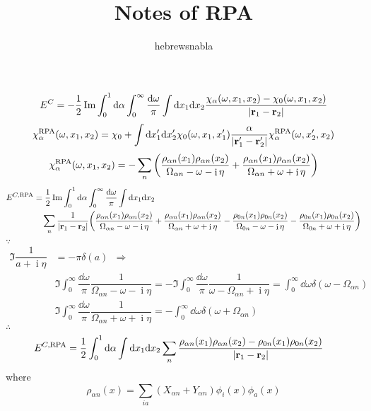 \documentclass[a4paper]{article}
\title{Notes of RPA}
\author{hebrewsnabla}
\DeclareMathOperator{\I}{\mathrm{i}}
\DeclareMathOperator{\dra}{\;\Rightarrow\;}
\DeclareMathOperator{\RPA}{\mathrm{RPA}}
\numberwithin{equation}{section}
\begin{document}
\maketitle


\begin{equation}\label{key}
E^C = -\dfrac{1}{2}\Im \int_0^1 \dd\alpha \int_0^\infty \dfrac{\dd\omega}{\pi} \int \dd x_1\dd x_2 \dfrac{\chi_\alpha(\omega,x_1,x_2) - \chi_0(\omega,x_1,x_2)}{\abs{\vb{r}_1 - \vb{r}_2}}
\end{equation}
\begin{equation}\label{key}
\chi_\alpha^{\RPA}(\omega,x_1,x_2) = \chi_0 + \int \dd x_1'\dd x_2' \chi_0(\omega,x_1,x_1') \dfrac{\alpha}{\abs{\vb{r}_1' - \vb{r}_2'}} \chi_\alpha^{\RPA}(\omega,x_2',x_2)
\end{equation}
\begin{equation}\label{key}
\chi_\alpha^{\RPA}(\omega,x_1,x_2) = -\sum_n \qty(\dfrac{\rho_{\alpha n}(x_1) \rho_{\alpha n}(x_2)}{\Omega_{\alpha n} - \omega - \I\eta} + \dfrac{\rho_{\alpha n}(x_1) \rho_{\alpha n}(x_2)}{\Omega_{\alpha n} + \omega + \I\eta})
\end{equation}
\begin{align}
E^{C,\RPA} &= \dfrac{1}{2}\Im \int_0^1 \dd\alpha \int_0^\infty \dfrac{\dd\omega}{\pi} \int \dd x_1\dd x_2 \notag\\ 
& \quad \sum_n \dfrac{1}{\abs{\vb{r}_1 - \vb{r}_2}}\qty(\dfrac{\rho_{\alpha n}(x_1) \rho_{\alpha n}(x_2)}{\Omega_{\alpha n} - \omega - \I\eta} + \dfrac{\rho_{\alpha n}(x_1) \rho_{\alpha n}(x_2)}{\Omega_{\alpha n} + \omega + \I\eta} 
- \dfrac{\rho_{0 n}(x_1) \rho_{0 n}(x_2)}{\Omega_{0 n} - \omega - \I\eta} - \dfrac{\rho_{0 n}(x_1) \rho_{0 n}(x_2)}{\Omega_{0 n} + \omega + \I\eta})
\end{align}
$ \because $
\begin{align}
\Im \dfrac{1}{a + \I\eta} &= -\pi\delta(a) \;\dra\; \\
& \Im\int_0^\infty  \dfrac{\dd\omega}{\pi} \dfrac{1}{\Omega_{\alpha n} - \omega - \I\eta} = -\Im\int_0^\infty  \dfrac{\dd\omega}{\pi} \dfrac{1}{\omega - \Omega_{\alpha n} + \I\eta} = \int_0^\infty \dd\omega \delta(\omega - \Omega_{\alpha n})  \\
& \Im\int_0^\infty  \dfrac{\dd\omega}{\pi} \dfrac{1}{\Omega_{\alpha n} + \omega + \I\eta} = -\int_0^\infty \dd\omega \delta(\omega + \Omega_{\alpha n}) 
\end{align}
$ \therefore $
\begin{align}
E^{C,\RPA} &= \dfrac{1}{2} \int_0^1 \dd\alpha \int \dd x_1\dd x_2 \sum_n \dfrac{\rho_{\alpha n}(x_1) \rho_{\alpha n}(x_2)  - \rho_{0 n}(x_1) \rho_{0 n}(x_2)}{\abs{\vb{r}_1 - \vb{r}_2}} %
\end{align}
where
\begin{equation}\label{key}
\rho_{\alpha n}(x) = \sum_{ia} (X_{\alpha n} + Y_{\alpha n}) \phi_i(x)\phi_a(x)
\end{equation}
\end{document}
